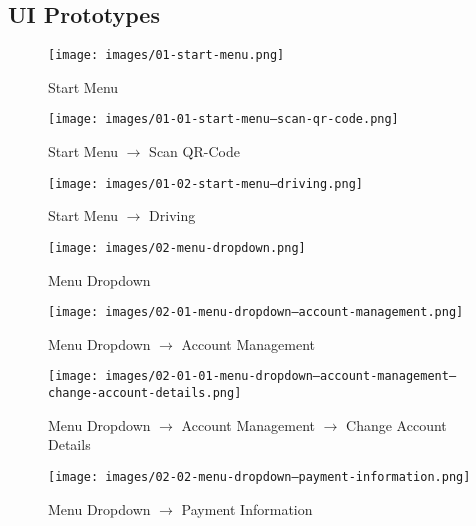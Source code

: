 \documentclass[a4paper, 12pt]{article}
\begin{document}
\newpage
\subsection{UI Prototypes}
\begin{figure} [htbp]
  \begin{center}
    \texttt{[image: images/01-start-menu.png]}
  \end{center}
  \caption{Start Menu}
\end{figure}

\begin{figure} [htbp]
  \begin{center}
    \texttt{[image: images/01-01-start-menu--scan-qr-code.png]}
  \end{center}
  \caption{Start Menu $\rightarrow$ Scan QR-Code}
\end{figure}

\begin{figure} [htbp]
  \begin{center}
    \texttt{[image: images/01-02-start-menu---driving.png]}
  \end{center}
  \caption{Start Menu $\rightarrow$ Driving}
\end{figure}

\begin{figure} [htbp]
  \begin{center}
    \texttt{[image: images/02-menu-dropdown.png]}
  \end{center}
  \caption{Menu Dropdown}
\end{figure}

\begin{figure} [htbp]
  \begin{center}
    \texttt{[image: images/02-01-menu-dropdown--account-management.png]}
  \end{center}
  \caption{Menu Dropdown $\rightarrow$ Account Management}
\end{figure}

\begin{figure} [htbp]
  \begin{center}
    \texttt{[image: images/02-01-01-menu-dropdown--account-management--change-account-details.png]}
  \end{center}
  \caption{Menu Dropdown $\rightarrow$ Account Management $\rightarrow$ Change Account Details}
\end{figure}

\begin{figure} [htbp]
  \begin{center}
    \texttt{[image: images/02-02-menu-dropdown--payment-information.png]}
  \end{center}
  \caption{Menu Dropdown $\rightarrow$ Payment Information}
\end{figure}
\end{document}
